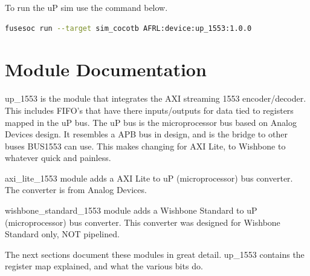 \par
To run the uP sim use the command below.
\begin{lstlisting}[language=bash]
fusesoc run --target sim_cocotb AFRL:device:up_1553:1.0.0
\end{lstlisting}


\newpage

\section{Module Documentation} \label{Module Documentation}

\par
up\_1553 is the module that integrates the AXI streaming 1553 encoder/decoder.
This includes FIFO's that have there inputs/outputs for data tied to registers mapped in the uP bus.
The uP bus is the microprocessor bus based on Analog Devices design. It resembles a APB bus in design,
and is the bridge to other buses BUS1553 can use. This makes changing for AXI Lite, to Wishbone to whatever
quick and painless.

\par
axi\_lite\_1553 module adds a AXI Lite to uP (microprocessor) bus converter. The converter is
from Analog Devices.

\par
wishbone\_standard\_1553 module adds a Wishbone Standard to uP (microprocessor) bus converter. This
converter was designed for Wishbone Standard only, NOT pipelined.

\vspace{15mm}
\par
The next sections document these modules in great detail. up\_1553 contains the register map explained, and what the various bits do.

